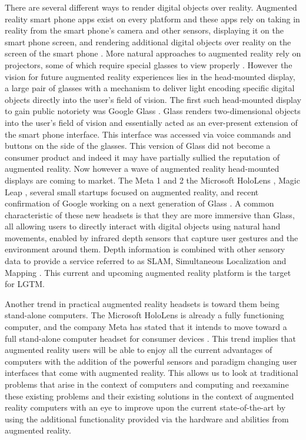 \documentclass[12pt]{report}
\begin{document}
There are several different ways to render digital objects over reality. Augmented reality smart phone apps exist on every platform and these apps rely on taking in reality from the smart phone's camera and other sensors, displaying it on the smart phone screen, and rendering additional digital objects over reality on the screen of the smart phone \cite{LayarArApp,GoogleTranslate,IonRoadArApp}. More natural approaches to augmented reality rely on projectors, some of which require special glasses to view properly \cite{VtCubeWebsite}. However the vision for future augmented reality experiences lies in the head-mounted display, a large pair of glasses with a mechanism to deliver light encoding specific digital objects directly into the user's field of vision. The first such head-mounted display to gain public notoriety was Google Glass \cite{GoogleGlassWebsite}. Glass renders two-dimensional objects into the user's field of vision and essentially acted as an ever-present extension of the smart phone interface. This interface was accessed via voice commands and buttons on the side of the glasses. This version of Glass did not become a consumer product and indeed it may have partially sullied the reputation of augmented reality. Now however a wave of augmented reality head-mounted displays are coming to market. The Meta 1 and 2 \cite{MetaWebsite} the Microsoft HoloLens \cite{HoloLensWebsite}, Magic Leap \cite{MagicLeapWebsite}, several small startups focused on augmented reality, and recent confirmation of Google working on a next generation of Glass \cite{WiredGoogleGlassNextGen2015}. A common characteristic of these new headsets is that they are more immersive than Glass, all allowing users to directly interact with digital objects using natural hand movements, enabled by infrared depth sensors that capture user gestures and the environment around them. Depth information is combined with other sensory data to provide a service referred to as SLAM, Simultaneous Localization and Mapping \cite{ParallelTrackingAndMappingKlein2007,MonoSlamDavison2007,VisualIntertialOdometryNonlinearLeutenegger2014,ProjectTangoWebsite,SlamPart1Durrant-Whyte2006}. This current and upcoming augmented reality platform is the target for LGTM. \par

Another trend in practical augmented reality headsets is toward them being stand-alone computers. The Microsoft HoloLens is already a fully functioning computer, and the company Meta has stated that it intends to move toward a full stand-alone computer headset for consumer devices \cite{MetaWebsite}. This trend implies that augmented reality users will be able to enjoy all the current advantages of computers with the addition of the powerful sensors and paradigm changing user interfaces that come with augmented reality. This allows us to look at traditional problems that arise in the context of computers and computing and reexamine these existing problems and their existing solutions in the context of augmented reality computers with an eye to improve upon the current state-of-the-art by using the additional functionality provided via the hardware and abilities from augmented reality. \par
\end{document}
